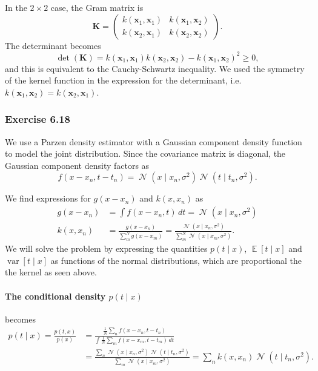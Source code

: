 \documentclass[12pt, a4paper]{article}
\newcommand{\vect}[1]{\bm{#1}}
\DeclareMathOperator{\N}{\mathcal{N}}
\DeclareMathOperator{\E}{\mathbb{E}}
\DeclareMathOperator{\var}{\operatorname{var}}
\begin{document}
In the $2 \times 2$ case, the Gram matrix is
\begin{equation*}
	\vect{K} =
	\begin{pmatrix}
	k (\vect{x}_1, \vect{x}_1) & k (\vect{x}_1, \vect{x}_2)\\ 
	k (\vect{x}_2, \vect{x}_1) & k (\vect{x}_2, \vect{x}_2)
	\end{pmatrix}.
\end{equation*}
The determinant becomes
\begin{equation*}
	\det (\vect{K}) = k (\vect{x}_1, \vect{x}_1) k (\vect{x}_2, \vect{x}_2)
	-
	k (\vect{x}_1, \vect{x}_2)^2 \geq 0,
\end{equation*}
and this is equivalent to the Cauchy-Schwartz inequality.
We used the symmetry of the kernel function in the expression for the determinant, i.e. $k (\vect{x}_1, \vect{x}_2) = k (\vect{x}_2, \vect{x}_1)$.



\subsubsection*{Exercise 6.18}
We use a Parzen density estimator with a Gaussian component density function to model the joint distribution.
Since the covariance matrix is diagonal, the Gaussian component density factors as
\begin{equation*}
	f(x - x_n, t - t_n) = 
	\N (x \mid x_n, \sigma^2)
	\N (t \mid t_n, \sigma^2).
\end{equation*}

We find expressions for $g(x - x_n)$ and $k(x, x_n)$ as
\begin{align*}
	g(x - x_n) &= \int f(x - x_n, t) \, dt = \N (x \mid x_n, \sigma^2) \\
	k(x, x_n) &= \frac{g(x - x_n)}{\sum_m^N g(x - x_m)} = \frac{\N (x \mid x_n, \sigma^2)}{\sum_m^N \N (x \mid x_m, \sigma^2)}.
\end{align*}
We will solve the problem by expressing the quantities $p(t \mid x)$, $\E \left[t \mid x\right]$ and $\var \left[t \mid x\right]$ as functions of the normal distributions, which are proportional the the kernel as seen above.


\paragraph{The conditional density $p(t \mid x)$} becomes
\begin{align*}
	p(t \mid x) = \frac{p(t, x)}{p(x)}
	&=
	\frac{\frac{1}{N} \sum_n f(x - x_n, t - t_n)}{\int \frac{1}{N} \sum_m f(x - x_m, t - t_m) \, dt} \\
	&=
	\frac{
		\sum_n \N (x \mid x_n, \sigma^2)
		\N (t \mid t_n, \sigma^2)
		}
	{\sum_m \N (x \mid x_m, \sigma^2)}
	= \sum_n k(x, x_n) \N (t \mid t_n, \sigma^2).
\end{align*}
\end{document}
